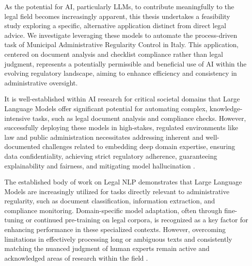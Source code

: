\documentclass[../main.tex]{subfiles}
\begin{document}
As the potential for AI, particularly LLMs, to contribute meaningfully to the legal field becomes increasingly apparent, this thesis undertakes a feasibility study exploring a specific, alternative application distinct from direct legal advice. We investigate leveraging these models to automate the process-driven task of Municipal Administrative Regularity Control in Italy. This application, centered on document analysis and checklist compliance rather than legal judgment, represents a potentially permissible and beneficial use of AI within the evolving regulatory landscape, aiming to enhance efficiency and consistency in administrative oversight.

It is well-established within AI research for critical societal domains that Large Language Models offer significant potential for automating complex, knowledge-intensive tasks, such as legal document analysis and compliance checks. However, successfully deploying these models in high-stakes, regulated environments like law and public administration necessitates addressing inherent and well-documented challenges related to embedding deep domain expertise, ensuring data confidentiality, achieving strict regulatory adherence, guaranteeing explainability and fairness, and mitigating model hallucination \cite{chenSurveyLargeLanguage2024}.

The established body of work on Legal NLP demonstrates that Large Language Models are increasingly utilized for tasks directly relevant to administrative regularity, such as document classification, information extraction, and compliance monitoring. Domain-specific model adaptation, often through fine-tuning or continued pre-training on legal corpora, is recognized as a key factor for enhancing performance in these specialized contexts. However, overcoming limitations in effectively processing long or ambiguous texts and consistently matching the nuanced judgment of human experts remain active and acknowledged areas of research within the field \cite{siinoExploringLLMsApplications2025}. 
\end{document}
